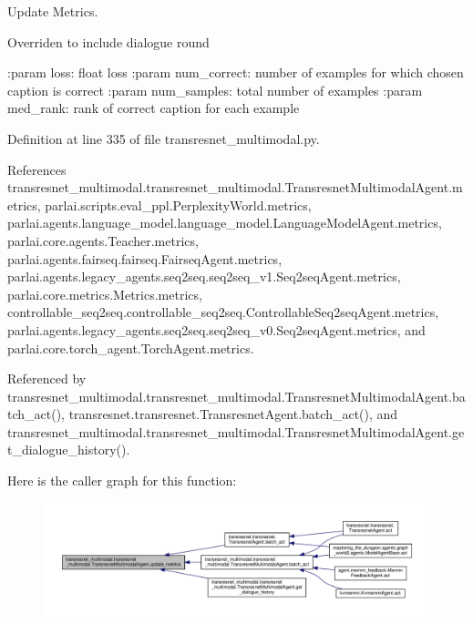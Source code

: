 \begin{DoxyVerb}Update Metrics.

Overriden to include dialogue round

:param loss:
    float loss
:param num_correct:
    number of examples for which chosen caption is correct
:param num_samples:
    total number of examples
:param med_rank:
    rank of correct caption for each example
\end{DoxyVerb}
 

Definition at line 335 of file transresnet\+\_\+multimodal.\+py.



References transresnet\+\_\+multimodal.\+transresnet\+\_\+multimodal.\+Transresnet\+Multimodal\+Agent.\+metrics, parlai.\+scripts.\+eval\+\_\+ppl.\+Perplexity\+World.\+metrics, parlai.\+agents.\+language\+\_\+model.\+language\+\_\+model.\+Language\+Model\+Agent.\+metrics, parlai.\+core.\+agents.\+Teacher.\+metrics, parlai.\+agents.\+fairseq.\+fairseq.\+Fairseq\+Agent.\+metrics, parlai.\+agents.\+legacy\+\_\+agents.\+seq2seq.\+seq2seq\+\_\+v1.\+Seq2seq\+Agent.\+metrics, parlai.\+core.\+metrics.\+Metrics.\+metrics, controllable\+\_\+seq2seq.\+controllable\+\_\+seq2seq.\+Controllable\+Seq2seq\+Agent.\+metrics, parlai.\+agents.\+legacy\+\_\+agents.\+seq2seq.\+seq2seq\+\_\+v0.\+Seq2seq\+Agent.\+metrics, and parlai.\+core.\+torch\+\_\+agent.\+Torch\+Agent.\+metrics.



Referenced by transresnet\+\_\+multimodal.\+transresnet\+\_\+multimodal.\+Transresnet\+Multimodal\+Agent.\+batch\+\_\+act(), transresnet.\+transresnet.\+Transresnet\+Agent.\+batch\+\_\+act(), and transresnet\+\_\+multimodal.\+transresnet\+\_\+multimodal.\+Transresnet\+Multimodal\+Agent.\+get\+\_\+dialogue\+\_\+history().

Here is the caller graph for this function\+:
\nopagebreak
\begin{figure}[H]
\begin{center}
\leavevmode
\includegraphics[width=350pt]{classtransresnet__multimodal_1_1transresnet__multimodal_1_1TransresnetMultimodalAgent_a2469ded22fbb2c690a814b54f51791d4_icgraph}
\end{center}
\end{figure}


